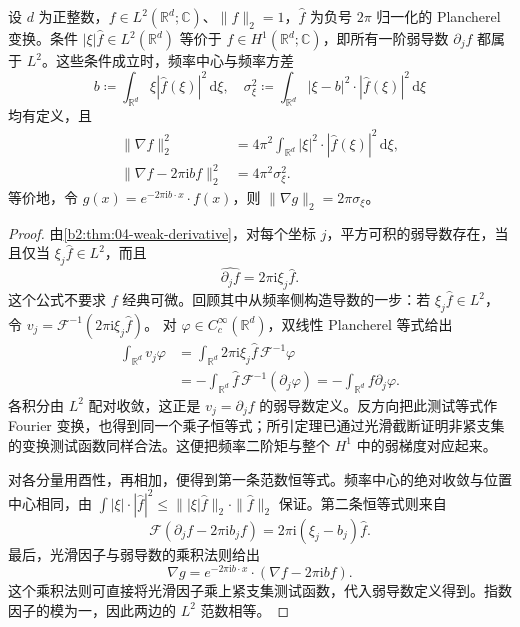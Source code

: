 \begin{proposition}[频率方差与弱梯度]\label{b2:prop:20-frequency-variance}
设 \(d\) 为正整数，\(f\in L^2(\mathbb R^d;\mathbb C)\)、\(\|f\|_2=1\)，\(\widehat f\) 为负号 \(2\pi\) 归一化的 Plancherel 变换。条件 \(|\xi|\widehat f\in L^2(\mathbb R^d)\) 等价于 \(f\in H^1(\mathbb R^d;\mathbb C)\)，即所有一阶弱导数 \(\partial_jf\) 都属于 \(L^2\)。这些条件成立时，频率中心与频率方差
\[
 b\coloneqq\int_{\mathbb R^d}\xi|\widehat f(\xi)|^2\,\mathrm d\xi,
 \quad
 \sigma_\xi^2\coloneqq
 \int_{\mathbb R^d}|\xi-b|^2\cdot|\widehat f(\xi)|^2\,\mathrm d\xi
\]
均有定义，且
\[
 \begin{aligned}
 \|\nabla f\|_2^2
   &=4\pi^2\int_{\mathbb R^d}|\xi|^2\cdot|\widehat f(\xi)|^2\,\mathrm d\xi,\\
 \|\nabla f-2\pi\mathrm i b f\|_2^2
   &=4\pi^2\sigma_\xi^2.
 \end{aligned}
\]
等价地，令 \(g(x)=e^{-2\pi\mathrm i b\cdot x}\cdot f(x)\)，则
\(\|\nabla g\|_2=2\pi\sigma_\xi\)。
\end{proposition}
\begin{proof}
由\cref{b2:thm:04-weak-derivative}，对每个坐标 \(j\)，平方可积的弱导数存在，当且仅当 \(\xi_j\widehat f\in L^2\)，而且
\[
 \widehat{\partial_jf}=2\pi\mathrm i\xi_j\widehat f.
\]
这个公式不要求 \(f\) 经典可微。回顾其中从频率侧构造导数的一步：若 \(\xi_j\widehat f\in L^2\)，令
\(v_j=\mathcal F^{-1}(2\pi\mathrm i\xi_j\widehat f)\)。
对 \(\varphi\in C_c^\infty(\mathbb R^d)\)，双线性 Plancherel 等式给出
\[
 \begin{aligned}
 \int_{\mathbb R^d}v_j\varphi
 &=\int_{\mathbb R^d}2\pi\mathrm i\xi_j\widehat f\,
                  \mathcal F^{-1}\varphi\\
 &=-\int_{\mathbb R^d}\widehat f\,
                  \mathcal F^{-1}(\partial_j\varphi)
 =-\int_{\mathbb R^d}f\partial_j\varphi.
 \end{aligned}
\]
各积分由 \(L^2\) 配对收敛，这正是 \(v_j=\partial_jf\) 的弱导数定义。反方向把此测试等式作 Fourier 变换，也得到同一个乘子恒等式；所引定理已通过光滑截断证明非紧支集的变换测试函数同样合法。这便把频率二阶矩与整个 \(H^1\) 中的弱梯度对应起来。

对各分量用酉性，再相加，便得到第一条范数恒等式。频率中心的绝对收敛与位置中心相同，由
\(\int|\xi|\cdot|\widehat f|^2\leq
\bigl\||\xi|\widehat f\bigr\|_2\cdot\|\widehat f\|_2\)
保证。第二条恒等式则来自
\[
 \mathcal F(\partial_jf-2\pi\mathrm i b_jf)
 =2\pi\mathrm i(\xi_j-b_j)\widehat f.
\]
最后，光滑因子与弱导数的乘积法则给出
\[
 \nabla g
 =e^{-2\pi\mathrm i b\cdot x}\cdot
   (\nabla f-2\pi\mathrm i b f).
\]
这个乘积法则可直接将光滑因子乘上紧支集测试函数，代入弱导数定义得到。指数因子的模为一，因此两边的 \(L^2\) 范数相等。
\end{proof}

